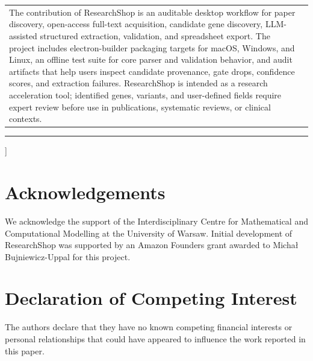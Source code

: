 \documentclass[final,5p,times,twocolumn]{elsarticle}
\begin{document}
\begin{@twocolumnfalse}
{\begin{tabularx}{\textwidth}{>{\raggedright\arraybackslash}p{} >{\raggedright\arraybackslash}X}
The contribution of ResearchShop is an auditable desktop workflow for paper discovery, open-access full-text acquisition, candidate gene discovery, LLM-assisted structured extraction, validation, and spreadsheet export. The project includes electron-builder packaging targets for macOS, Windows, and Linux, an offline test suite for core parser and validation behavior, and audit artifacts that help users inspect candidate provenance, gate drops, confidence scores, and extraction failures. ResearchShop is intended as a research acceleration tool; identified genes, variants, and user-defined fields require expert review before use in publications, systematic reviews, or clinical contexts.
\end{tabularx}
}
\vspace{0.75em}
\hrule
\vspace{0.95em}

\vspace{1.0em}
\vspace{1.2em}
\end{@twocolumnfalse}
]
\makeatother





\section*{Acknowledgements}
We acknowledge the support of the Interdisciplinary Centre for Mathematical and Computational Modelling at the University of Warsaw. Initial development of ResearchShop was supported by an Amazon Founders grant awarded to Micha{\l} Bujniewicz-Uppal for this project.

\section*{Declaration of Competing Interest}
The authors declare that they have no known competing financial interests or personal relationships that could have appeared to influence the work reported in this paper.

\begingroup
\footnotesize
\raggedright
\setlength{\bibsep}{0pt}

\endgroup
\end{document}
